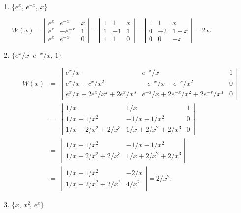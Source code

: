 \documentclass{ximera}
\begin{document}
\begin{problem}
\begin{enumerate}
\item $\{e^x,\,e^{-x},\,x\}$

\begin{solution}
$W(x)=\left|\begin{array}{crc}e^x&e^{-x}&x\\e^x&-e^{-x}&1
\\e^x&e^{-x}&0\end{array}\right|
=\left|\begin{array}{crc}1&1&x\\1&-1&1
\\1&1&0\end{array}\right|
=\left|\begin{array}{crc}1&1&x\\0&-2&1-x
\\0&0&-x\end{array}\right|=
2x$.
\end{solution}

\item $\{e^x/x,\,e^{-x}/x,\,1\}$

\begin{solution}
\begin{eqnarray*}
W(x)&=&\left|\begin{array}{ccc}e^x/x&e^{-x}/x&1\\
e^x/x-e^x/x^2&-e^{-x}/x-e^{-x}/x^2&0\\
e^x/x-2e^x/x^2+2e^x/x^3&e^{-x}/x+2e^{-x}/x^2+2e^{-x}/x^3&0
\end{array}\right|\\
&=&\left|\begin{array}{ccc}1/x&1/x&1\\
1/x-1/x^2&-1/x-1/x^2&0\\
1/x-2/x^2+2/x^3&1/x+2/x^2+2/x^3&0
\end{array}\right|\\
&=&\left|\begin{array}{cc}
1/x-1/x^2&-1/x-1/x^2\\
1/x-2/x^2+2/x^3&1/x+2/x^2+2/x^3
\end{array}\right|\\
&=&\left|\begin{array}{cr}
1/x-1/x^2&-2/x\\
1/x-2/x^2+2/x^3&4/x^2
\end{array}\right|=2/x^2.
\end{eqnarray*}
\end{solution}

\item $\{x,\,x^2,\,e^x\}$


\end{enumerate}
\end{problem}
\end{document}
